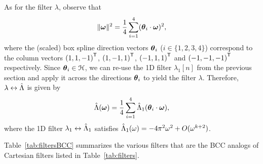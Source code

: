 As for the filter $\lambda$, observe that
\begin{equation}
  \lVert\boldsymbol{\omega}\rVert^2 = \frac{1}{4}\sum_{i=1}^4
  (\boldsymbol{\theta}_i \cdot \boldsymbol{\omega})^2,
\end{equation}
where the (scaled) box spline direction vectors $\boldsymbol{\theta}_i$ ($i
\in \{1,2,3,4\}$) correspond to the column vectors
${(1,1,-1)}^{\mathsf{T}}$, ${(1,-1,1)}^{\mathsf{T}}$, ${(-1,1,1)}^{\mathsf{T}}$ and
${(-1,-1,-1)}^{\mathsf{T}}$ respectively. Since $\boldsymbol{\theta}_i \in
\mathcal{H}$, we can re-use the 1D filter $\lambda_1[n]$ from the
previous section and apply it across the directions $\boldsymbol{\theta}_i$
to yield the filter $\lambda$.  Therefore,
$\lambda \leftrightarrow \hat{\Lambda}$ is given by
\begin{equation}
  \hat{\Lambda}(\boldsymbol{\omega}) = \frac{1}{4}\sum_{i=1}^4
  \hat{\Lambda}_1(\boldsymbol{\theta}_i \cdot \boldsymbol{\omega}),
\end{equation}
where the 1D filter $\lambda_1 \leftrightarrow \hat{\Lambda}_1$ satisfies 
$\hat{\Lambda}_1(\omega) = -4\pi^2\omega^2 + O(\omega^{k+2})$.

Table~\ref{tab:filtersBCC} summarizes the various filters that are the
BCC analogs of Cartesian filters listed in Table~\ref{tab:filters}.

